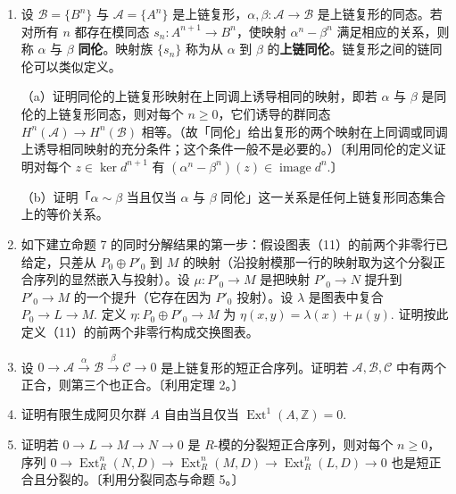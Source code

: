 \begin{enumerate}
（d）证明若 \(\alpha\) 是单射且 \(\beta'\) 是满射（即上面交换图表的两行可以延拓为短正合序列），则（c）中的正合序列可以延拓为
\[
0 \to \ker f \to \ker g \to \ker h \xrightarrow{\delta} \operatorname{coker}f \to \operatorname{coker}g \to \operatorname{coker}h \to 0.
\]

\item 设 \(\mathcal{B} = \{B^n\}\) 与 \(\mathcal{A} = \{A^n\}\) 是上链复形，\(\alpha, \beta : \mathcal{A} \to \mathcal{B}\) 是上链复形的同态。若对所有 \(n\) 都存在模同态 \(s_n : A^{n+1} \to B^n\)，使映射 \(\alpha^n-\beta^n\) 满足相应的关系，则称 \(\alpha\) 与 \(\beta\) \textbf{同伦}。映射族 \(\{s_n\}\) 称为从 \(\alpha\) 到 \(\beta\) 的\textbf{上链同伦}。链复形之间的链同伦可以类似定义。

（a）证明同伦的上链复形映射在上同调上诱导相同的映射，即若 \(\alpha\) 与 \(\beta\) 是同伦的上链复形同态，则对每个 \(n \geq 0\)，它们诱导的群同态 \(H^n(\mathcal{A}) \to H^n(\mathcal{B})\) 相等。（故「同伦」给出复形的两个映射在上同调或同调上诱导相同映射的充分条件；这个条件一般不是必要的。）〔利用同伦的定义证明对每个 \(z \in \ker d^{n+1}\) 有 \((\alpha^n-\beta^n)(z) \in \operatorname{image}d^n\).〕

（b）证明「\(\alpha \sim \beta\) 当且仅当 \(\alpha\) 与 \(\beta\) 同伦」这一关系是任何上链复形同态集合上的等价关系。

\item 如下建立命题 7 的同时分解结果的第一步：假设图表（11）的前两个非零行已给定，只差从 \(P_0 \oplus P'_0\) 到 \(M\) 的映射（沿投射模那一行的映射取为这个分裂正合序列的显然嵌入与投射）。设 \(\mu : P'_0 \to M\) 是把映射 \(P'_0 \to N\) 提升到 \(P'_0 \to M\) 的一个提升（它存在因为 \(P'_0\) 投射）。设 \(\lambda\) 是图表中复合 \(P_0 \to L \to M\). 定义 \(\eta : P_0 \oplus P'_0 \to M\) 为 \(\eta(x,y) = \lambda(x)+\mu(y)\). 证明按此定义（11）的前两个非零行构成交换图表。

\item 设 \(0 \to \mathcal{A} \xrightarrow{\alpha} \mathcal{B} \xrightarrow{\beta} \mathcal{C} \to 0\) 是上链复形的短正合序列。证明若 \(\mathcal{A}, \mathcal{B}, \mathcal{C}\) 中有两个正合，则第三个也正合。〔利用定理 2。〕

\item 证明有限生成阿贝尔群 \(A\) 自由当且仅当 \(\operatorname{Ext}^1(A, \mathbb{Z}) = 0\).

\item 证明若 \(0 \to L \to M \to N \to 0\) 是 \(R\)-模的分裂短正合序列，则对每个 \(n \geq 0\)，序列 \(0 \to \operatorname{Ext}_R^n(N, D) \to \operatorname{Ext}_R^n(M, D) \to \operatorname{Ext}_R^n(L, D) \to 0\) 也是短正合且分裂的。〔利用分裂同态与命题 5。〕


\end{enumerate}
